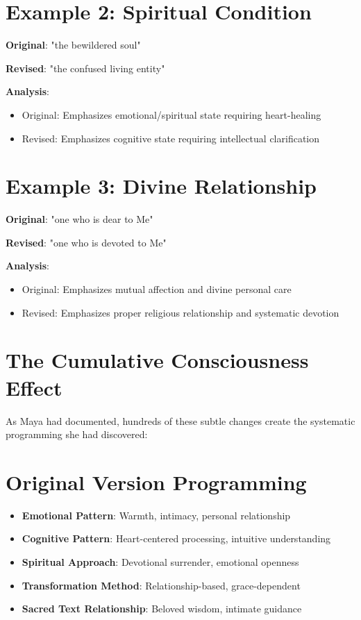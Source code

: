 \documentclass[11pt,twoside]{book}
\begin{document}
\section*{Example 2: Spiritual Condition}
\label{sec:org76affde}
\textbf{\textbf{Original}}: "the bewildered soul"

\textbf{\textbf{Revised}}: "the confused living entity"

\textbf{\textbf{Analysis}}:
\begin{itemize}
\item Original: Emphasizes emotional/spiritual state requiring heart-healing
\item Revised: Emphasizes cognitive state requiring intellectual clarification
\end{itemize}
\section*{Example 3: Divine Relationship}
\label{sec:org9fa6a4b}
\textbf{\textbf{Original}}: "one who is dear to Me"

\textbf{\textbf{Revised}}: "one who is devoted to Me"

\textbf{\textbf{Analysis}}:
\begin{itemize}
\item Original: Emphasizes mutual affection and divine personal care
\item Revised: Emphasizes proper religious relationship and systematic devotion
\end{itemize}
\section*{The Cumulative Consciousness Effect}
\label{sec:orgf7e14f3}

As Maya had documented, hundreds of these subtle changes create the systematic programming she had discovered:
\section*{Original Version Programming}
\label{sec:org439f4bc}
\begin{itemize}
\item \textbf{\textbf{Emotional Pattern}}: Warmth, intimacy, personal relationship
\item \textbf{\textbf{Cognitive Pattern}}: Heart-centered processing, intuitive understanding
\item \textbf{\textbf{Spiritual Approach}}: Devotional surrender, emotional openness
\item \textbf{\textbf{Transformation Method}}: Relationship-based, grace-dependent
\item \textbf{\textbf{Sacred Text Relationship}}: Beloved wisdom, intimate guidance
\end{itemize}
\end{document}
